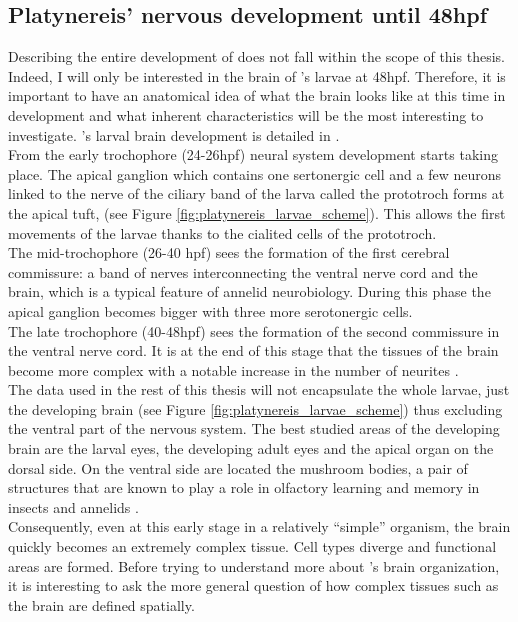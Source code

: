 	  \subsection{Platynereis' nervous development until 48hpf}
	 Describing the entire development of \platy{} does not fall within the scope of this thesis. Indeed, I will only be interested in the brain of \platy{}'s larvae at 48hpf. Therefore, it is important to have an anatomical idea of what the brain looks like at this time in development and what inherent characteristics will be the most interesting to investigate. \platy{}'s larval brain development is detailed in \cite{Fischer10}.\\
     From the early trochophore (24-26hpf) neural system development starts taking place. The apical ganglion which contains one sertonergic cell and a few neurons linked to the nerve of the ciliary band of the larva called the prototroch forms at the apical tuft, (see Figure \ref{fig:platynereis_larvae_scheme}). This allows the first movements of the larvae thanks to the cialited cells of the prototroch.\\
     The mid-trochophore (26-40 hpf) sees the formation of the first cerebral commissure: a band of nerves interconnecting the ventral nerve cord and the brain, which is a typical feature of annelid neurobiology. During this phase the apical ganglion becomes bigger with three more serotonergic cells.\\
     The late trochophore (40-48hpf) sees the formation of the second commissure in the ventral nerve cord. It is at the end of this stage that the tissues of the brain become more complex with a notable increase in the number of neurites \cite{Fischer10}.\\
     The data used in the rest of this thesis will not encapsulate the whole larvae, just the developing brain (see Figure \ref{fig:platynereis_larvae_scheme}) thus excluding the ventral part of the nervous system. The best studied areas of the developing brain are the larval eyes, the developing adult eyes and the apical organ on the dorsal side. On the ventral side are located the mushroom bodies, a pair of structures that are known to play a role in olfactory learning and memory in insects and annelids \cite{Tomer10}.\\
     
     Consequently, even at this early stage in a relatively ``simple'' organism, the brain quickly becomes an extremely complex tissue. Cell types diverge and functional areas are formed. Before trying to understand more about \platy{}'s brain organization, it is interesting to ask the more general question of how complex tissues such as the brain are defined spatially.
     
